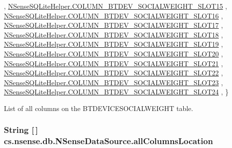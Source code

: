 \begin{DoxyCode}
      ,
            \hyperlink{classcs_1_1nsense_1_1db_1_1_n_sense_s_q_lite_helper_aa68b0c0c8363dd4ac743e8032962fb61}{NSenseSQLiteHelper.COLUMN\_BTDEV\_SOCIALWEIGHT\_SLOT15}
      ,
            \hyperlink{classcs_1_1nsense_1_1db_1_1_n_sense_s_q_lite_helper_abee33f90ba813221b66b297fd29ee0b3}{NSenseSQLiteHelper.COLUMN\_BTDEV\_SOCIALWEIGHT\_SLOT16}
      ,
            \hyperlink{classcs_1_1nsense_1_1db_1_1_n_sense_s_q_lite_helper_a39e624085739d00cfec1244154401d95}{NSenseSQLiteHelper.COLUMN\_BTDEV\_SOCIALWEIGHT\_SLOT17}
      ,
            \hyperlink{classcs_1_1nsense_1_1db_1_1_n_sense_s_q_lite_helper_a7983ef2177f51a449da7b68a5343cc84}{NSenseSQLiteHelper.COLUMN\_BTDEV\_SOCIALWEIGHT\_SLOT18}
      ,
            \hyperlink{classcs_1_1nsense_1_1db_1_1_n_sense_s_q_lite_helper_ab0c1f50ed163bd3b4057a9e4ba57a056}{NSenseSQLiteHelper.COLUMN\_BTDEV\_SOCIALWEIGHT\_SLOT19}
      ,
            \hyperlink{classcs_1_1nsense_1_1db_1_1_n_sense_s_q_lite_helper_a121f5f29c559e58d1af9815678031c19}{NSenseSQLiteHelper.COLUMN\_BTDEV\_SOCIALWEIGHT\_SLOT20}
      ,
            \hyperlink{classcs_1_1nsense_1_1db_1_1_n_sense_s_q_lite_helper_a72d9ba1ef178bc4d32717e2347b39645}{NSenseSQLiteHelper.COLUMN\_BTDEV\_SOCIALWEIGHT\_SLOT21}
      ,
            \hyperlink{classcs_1_1nsense_1_1db_1_1_n_sense_s_q_lite_helper_a0e2d7e92cafb6c8c4cdbea690e508669}{NSenseSQLiteHelper.COLUMN\_BTDEV\_SOCIALWEIGHT\_SLOT22}
      ,
            \hyperlink{classcs_1_1nsense_1_1db_1_1_n_sense_s_q_lite_helper_a4025037f837af731eeef0e47967a0f21}{NSenseSQLiteHelper.COLUMN\_BTDEV\_SOCIALWEIGHT\_SLOT23}
      ,
            \hyperlink{classcs_1_1nsense_1_1db_1_1_n_sense_s_q_lite_helper_aa10b4323dffe120b65d76c52511d877f}{NSenseSQLiteHelper.COLUMN\_BTDEV\_SOCIALWEIGHT\_SLOT24}
      ,
    \}
\end{DoxyCode}
List of all columns on the B\-T\-D\-E\-V\-I\-C\-E\-S\-O\-C\-I\-A\-L\-W\-E\-I\-G\-H\-T table. \hypertarget{classcs_1_1nsense_1_1db_1_1_n_sense_data_source_a8efb5ab2f84fcd3e210496c746235c0e}{
\subsubsection[{all\-Columns\-Location}]{\setlength{\rightskip}{0pt plus 5cm}String \mbox{[}$\,$\mbox{]} cs.\-nsense.\-db.\-N\-Sense\-Data\-Source.\-all\-Columns\-Location\hspace{0.3cm}{\ttfamily [private]}}}\label{classcs_1_1nsense_1_1db_1_1_n_sense_data_source_a8efb5ab2f84fcd3e210496c746235c0e}
